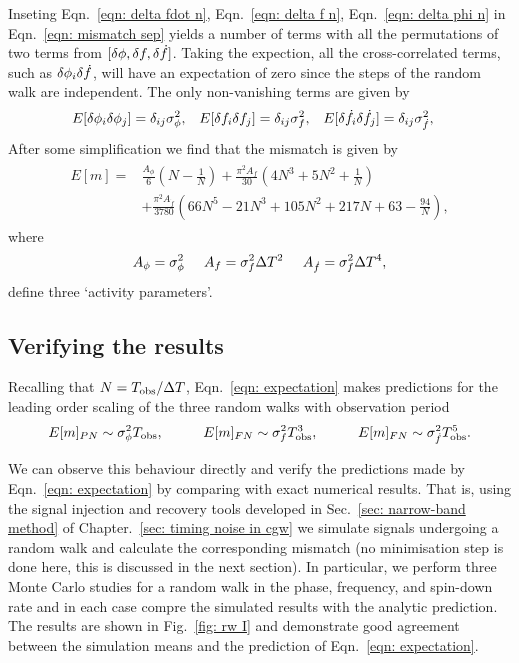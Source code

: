 Inseting Eqn.~\eqref{eqn: delta fdot n}, Eqn.~\eqref{eqn: delta f n},
Eqn.~\eqref{eqn: delta phi n}  in Eqn.~\eqref{eqn: mismatch sep} yields a
number of terms with all the permutations of two terms from $[\delta \phi, \delta f,
\delta \dot{f}]$. Taking the expection, all the cross-correlated terms, such as
$\delta\phi_{i}\delta \dot{f}$, will have an expectation of zero since the steps of the
random walk are independent. The only non-vanishing terms are given by
\begin{align}
E[\delta\phi_{i}\delta\phi_{j}] &= \delta_{ij}\sigma_{\phi}^{2}, &
E[\delta f_{i}\delta f_{j}] &= \delta_{ij}\sigma_{f}^{2},&
E[\delta\dot{f}_{i}\delta\dot{f}_{j}] &= \delta_{ij}\sigma_{\dot{f}}^{2},
\end{align}
After some simplification we find that the mismatch is given by
\begin{align}
\begin{split}
E[m]   = &  \frac{A_{\phi}}{6} \left(N - \frac{1}{N}\right)
+ \frac{\pi^{2} A_{{f}}}{30}\left(4 N^{3} + 5 N^{2} + \frac{1}{N}\right)\\
 & +  \frac{\pi^{2} A_{{\dot{f}}}}{3780} \left(66 N^{5} - 21 N^{3} + 105 N^{2}
 + 217 N + 63 - \frac{94}{N}\right),
\end{split}
\label{eqn: expectation}
\end{align}
where
\begin{equation}
	A_{\phi} = \sigma_{\phi}^{2} \;\;\;\;\;
    A_{f} = \sigma_{f}^{2}\Delta T^{2} \;\;\;\;\;
    A_{\dot{f}} = \sigma_{f}^{2}\Delta T^{4},
\end{equation}
define three `activity parameters'.

\subsection{Verifying the results}
Recalling that $N=T_{\mathrm{obs}}/\Delta T$, Eqn.~\eqref{eqn: expectation} makes
predictions for the leading order
scaling of the three random walks with observation period
\begin{equation}
E[m]_{PN} \sim \sigP \Tobs, \hspace{10mm}
E[m]_{FN} \sim \sigF \Tobs^{3}, \hspace{10mm}
E[m]_{FN} \sim \sigS \Tobs^{5}.
\end{equation}

We can observe this behaviour directly and verify the predictions made by
Eqn.~\eqref{eqn: expectation} by comparing with exact numerical results. That
is, using the signal injection and recovery tools developed in Sec.~\ref{sec:
narrow-band method} of Chapter.~\ref{sec: timing noise in cgw} we simulate
signals undergoing a random walk and calculate the corresponding mismatch (no
minimisation step is done here, this is discussed in the next section). In
particular, we perform three Monte Carlo studies for a random walk in the
phase, frequency, and spin-down rate and in each case compre the simulated
results with the analytic prediction. The results are shown in Fig.~\ref{fig: rw I}
and demonstrate good agreement between the simulation means and the prediction
of Eqn.~\eqref{eqn: expectation}.

